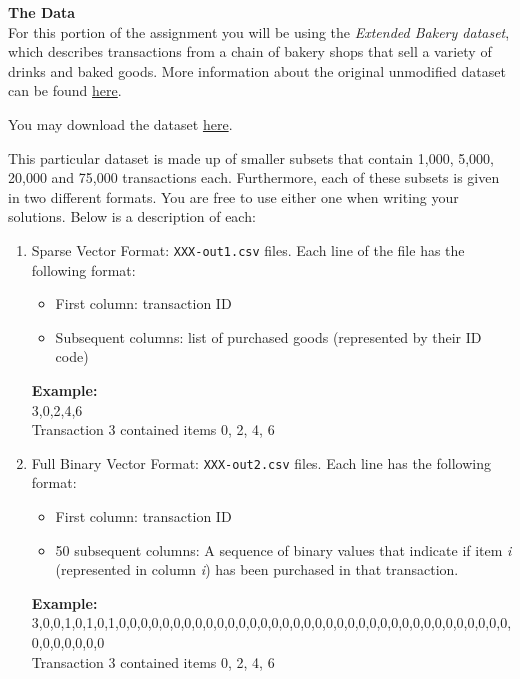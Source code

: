 \documentclass[paper=a4, fontsize=11pt]{scrartcl} %
\numberwithin{equation}{section} %
\numberwithin{figure}{section} %
\numberwithin{table}{section} %
\begin{document}
\textbf{The Data}\\
For this portion of the assignment you will be using the \textit{Extended Bakery dataset}, which describes transactions from a chain of bakery shops that sell a variety of drinks and baked goods. More information about the original unmodified dataset can be found \href{https://wiki.csc.calpoly.edu/datasets/wiki/ExtendedBakery}{here}.

\vspace{6pt}

You may download the dataset \href{https://github.com/cse40647/cse40647/blob/sp.14/assignment2/bakery.zip}{here}.

\vspace{6pt}

This particular dataset is made up of smaller subsets that contain 1,000, 5,000, 20,000 and 75,000 transactions each. Furthermore, each of these subsets is given in two different formats. You are free to use either one when writing your solutions. Below is a description of each:

\begin{enumerate}
\item Sparse Vector Format: \texttt{XXX-out1.csv} files. Each line of the file has the following format:
\begin{itemize}
\item First column: transaction ID
\item Subsequent columns: list of purchased goods (represented by their ID code)
\end{itemize}
\textbf{Example:}\\
3,0,2,4,6\\
Transaction 3 contained items 0, 2, 4, 6
\item Full Binary Vector Format: \texttt{XXX-out2.csv} files. Each line has the following format:
\begin{itemize}
\item First column: transaction ID
\item 50 subsequent columns: A sequence of binary values that indicate if item \textit{i} (represented in column \textit{i}) has been purchased in that transaction.
\end{itemize}
\textbf{Example:}\\
3,0,0,1,0,1,0,1,0,0,0,0,0,0,0,0,0,0,0,0,0,0,0,0,0,0,0,0,0,0,0,0,0,0,0,0,0,0,0,0,0,0,0,0,0,0,0,0,0,0,0\\
Transaction 3 contained items 0, 2, 4, 6
\end{enumerate}
\end{document}
